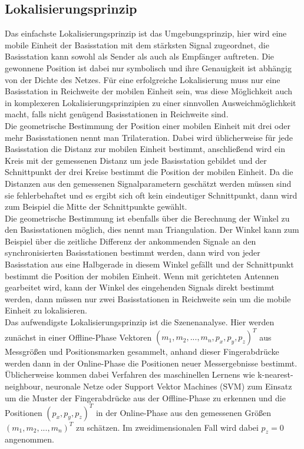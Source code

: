 \subsection{Lokalisierungsprinzip}
Das einfachste Lokalisierungsprinzip ist das Umgebungsprinzip, hier wird eine mobile Einheit der Basisstation mit dem stärksten Signal zugeordnet, die Basisstation kann sowohl als Sender als auch als Empfänger auftreten. Die gewonnene Position ist dabei nur symbolisch und ihre Genauigkeit ist abhängig von der Dichte des Netzes. Für eine erfolgreiche Lokalisierung muss nur eine Basisstation in Reichweite der mobilen Einheit sein, was diese Möglichkeit auch in komplexeren Lokalisierungsprinzipien zu einer sinnvollen Ausweichmöglichkeit macht, falls nicht genügend Basisstationen in Reichweite sind. \\
Die geometrische Bestimmung der Position einer mobilen Einheit mit drei oder mehr Basisstationen nennt man Trilateration. Dabei wird üblicherweise für jede Basisstation die Distanz zur mobilen Einheit bestimmt, anschließend wird ein Kreis mit der gemessenen Distanz um jede Basisstation gebildet und der Schnittpunkt der drei Kreise bestimmt die Position der mobilen Einheit. Da die Distanzen aus den gemessenen Signalparametern geschätzt werden müssen sind sie fehlerbehaftet und es ergibt sich oft kein eindeutiger Schnittpunkt, dann wird zum Beispiel die Mitte der Schnittpunkte gewählt. \\
Die geometrische Bestimmung ist ebenfalls über die Berechnung der Winkel zu den Basisstationen möglich, dies nennt man Triangulation. Der Winkel kann zum Beispiel über die zeitliche Differenz der ankommenden Signale an den synchronisierten Basisstationen bestimmt werden, dann wird von jeder Basisstation aus eine Halbgerade in diesem Winkel gefällt und der Schnittpunkt bestimmt die Position der mobilen Einheit. %
Wenn mit gerichteten Antennen gearbeitet wird, kann der Winkel des eingehenden Signals direkt bestimmt werden, dann müssen nur zwei Basisstationen in Reichweite sein um die mobile Einheit zu lokalisieren. \\
Das aufwendigste Lokalisierungsprinzip ist die Szenenanalyse. Hier werden zunächst in einer Offline-Phase Vektoren $(m_1,m_2,...,m_n,p_x,p_y,p_z)^T$ aus Messgrößen und Positionsmarken gesammelt, anhand dieser Fingerabdrücke werden dann in der Online-Phase die Positionen neuer Messergebnisse bestimmt. Üblicherweise kommen dabei Verfahren des maschinellen Lernens wie k-nearest-neighbour, neuronale Netze oder Support Vektor Machines (SVM) zum Einsatz um die Muster der Fingerabdrücke aus der Offline-Phase zu erkennen und die Positionen $(p_x,p_y,p_z)^T$ in der Online-Phase aus den gemessenen Größen $(m_1,m_2,...,m_n)^T$ zu schätzen. Im zweidimensionalen Fall wird dabei $p_z = 0$ angenommen.

